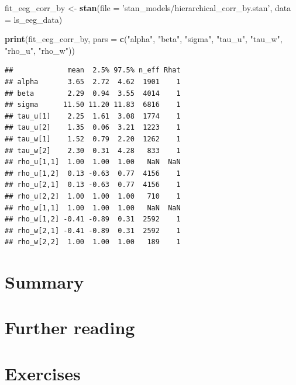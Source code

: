 \documentclass[12pt,]{krantz}
\newenvironment{Shaded}{\begin{snugshade}}{\end{snugshade}}
\newcommand{\KeywordTok}[1]{\textcolor[rgb]{0.13,0.29,0.53}{\textbf{#1}}}
\newcommand{\DataTypeTok}[1]{\textcolor[rgb]{0.13,0.29,0.53}{#1}}
\newcommand{\StringTok}[1]{\textcolor[rgb]{0.31,0.60,0.02}{#1}}
\newcommand{\NormalTok}[1]{#1}
\theoremstyle{definition}
\theoremstyle{definition}
\theoremstyle{definition}
\theoremstyle{remark}
\begin{document}
\begin{Shaded}
\begin{Highlighting}[]
\NormalTok{fit_eeg_corr_by <-}\StringTok{ }\KeywordTok{stan}\NormalTok{(}\DataTypeTok{file =} \StringTok{'stan_models/hierarchical_corr_by.stan'}\NormalTok{, }
                 \DataTypeTok{data =}\NormalTok{ ls_eeg_data)}
\end{Highlighting}
\end{Shaded}

\begin{Shaded}
\begin{Highlighting}[]
\KeywordTok{print}\NormalTok{(fit_eeg_corr_by, }\DataTypeTok{pars =}
                       \KeywordTok{c}\NormalTok{(}\StringTok{"alpha"}\NormalTok{, }\StringTok{"beta"}\NormalTok{, }\StringTok{"sigma"}\NormalTok{, }\StringTok{"tau_u"}\NormalTok{, }\StringTok{"tau_w"}\NormalTok{, }\StringTok{"rho_u"}\NormalTok{, }\StringTok{"rho_w"}\NormalTok{))}
\end{Highlighting}
\end{Shaded}

\begin{verbatim}
##             mean  2.5% 97.5% n_eff Rhat
## alpha       3.65  2.72  4.62  1901    1
## beta        2.29  0.94  3.55  4014    1
## sigma      11.50 11.20 11.83  6816    1
## tau_u[1]    2.25  1.61  3.08  1774    1
## tau_u[2]    1.35  0.06  3.21  1223    1
## tau_w[1]    1.52  0.79  2.20  1262    1
## tau_w[2]    2.30  0.31  4.28   833    1
## rho_u[1,1]  1.00  1.00  1.00   NaN  NaN
## rho_u[1,2]  0.13 -0.63  0.77  4156    1
## rho_u[2,1]  0.13 -0.63  0.77  4156    1
## rho_u[2,2]  1.00  1.00  1.00   710    1
## rho_w[1,1]  1.00  1.00  1.00   NaN  NaN
## rho_w[1,2] -0.41 -0.89  0.31  2592    1
## rho_w[2,1] -0.41 -0.89  0.31  2592    1
## rho_w[2,2]  1.00  1.00  1.00   189    1
\end{verbatim}

\section{Summary}\label{summary-7}

\section{Further reading}\label{further-reading-9}

\section{Exercises}\label{exercises-8}
\end{document}
